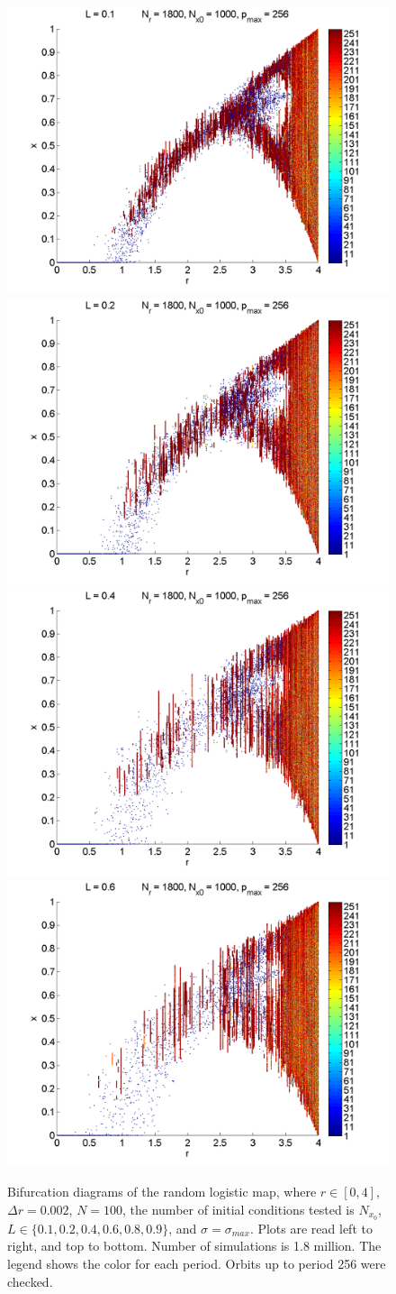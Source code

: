 \begin{figure}[H]\linespread{1}
\caption[Bifurcation diagrams of the random logistic map, $\sigma=\sigma_{max}$]{Bifurcation diagrams of the random
logistic map, where $r \in [0,4]$, $\Delta r = 0.002$, $N=100$, the
number of initial conditions tested is $N_{x_0}$, $L\in
\{0.1,0.2,0.4,0.6,0.8,0.9\}$, and $\sigma=\sigma_{max}$. Plots are read left to right, and top to
bottom. Number of simulations is 1.8 million. The legend shows the color for each period. Orbits up to period 256 were checked.}\label{fig:rlogbif}
	\begin{center}
		\includegraphics[width=.5\textwidth]{figs/rlog_bif_L_01.png}\hfill
		\includegraphics[width=.5\textwidth]{figs/rlog_bif_L_02.png}\\
		\includegraphics[width=.5\textwidth]{figs/rlog_bif_L_04.png}\hfill
		\includegraphics[width=.5\textwidth]{figs/rlog_bif_L_06.png}\\

\end{center}
\end{figure}
